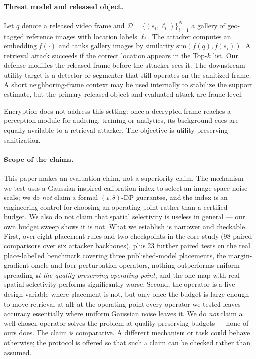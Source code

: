 \documentclass[10pt,journal]{IEEEtran}
\begin{document}
\paragraph{Threat model and released object.}
Let $q$ denote a released video frame and $\mathcal{D}=\{(s_i,\ell_i)\}_{i=1}^N$ a gallery of geo-tagged reference images with location labels $\ell_i$. The attacker computes an embedding $f(\cdot)$ and ranks gallery images by similarity $\mathrm{sim}(f(q),f(s_i))$. A retrieval attack succeeds if the correct location appears in the Top-$k$ list. Our defense modifies the released frame before the attacker sees it. The downstream utility target is a detector or segmenter that still operates on the sanitized frame. A short neighboring-frame context may be used internally to stabilize the support estimate, but the primary released object and evaluated attack are frame-level.

Encryption does not address this setting: once a decrypted frame reaches a
perception module for auditing, training or analytics, its background cues are
equally available to a retrieval attacker. The objective is
utility-preserving sanitization.

\paragraph{Scope of the claims.}
This paper makes an evaluation claim, not a superiority claim. The mechanism we test uses a Gaussian-inspired calibration index to select an image-space noise scale; we do \emph{not} claim a formal $(\varepsilon,\delta)$-DP guarantee, and the index is an engineering control for choosing an operating point rather than a certified budget. We also do not claim that spatial selectivity is useless in general --- our own budget sweep shows it is not. What we establish is narrower and checkable. First, over eight placement rules and two checkpoints in the core study (98 paired comparisons over six attacker backbones), plus 23 further paired tests on the real place-labelled benchmark covering three published-model placements, the margin-gradient oracle and four perturbation operators, nothing outperforms uniform spreading \emph{at the quality-preserving operating point}, and the one map with real spatial selectivity performs significantly worse. Second, the operator is a live design variable where placement is not, but
only once the budget is large enough to move retrieval at all; at the
operating point every operator we tested leaves accuracy essentially where
uniform Gaussian noise leaves it. We do \emph{not} claim a well-chosen
operator solves the problem at quality-preserving budgets --- none of ours
does. The claim is comparative. A different mechanism or task could behave otherwise; the protocol is offered so that such a claim can be checked rather than assumed.
\end{document}
